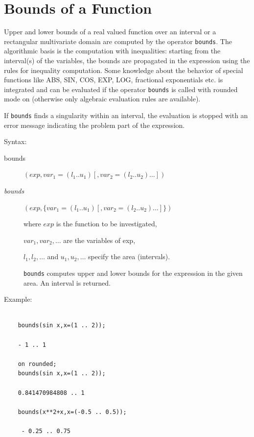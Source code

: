 \section{Bounds of a Function}
\hypertarget{operator:BOUNDS}{}

Upper and lower bounds of a real valued function over an
interval or a rectangular multivariate domain are computed
by the operator \texttt{bounds}. The algorithmic basis is the computation
with inequalities: starting from the interval(s) of the
variables, the bounds are propagated in the expression
using the rules for inequality computation. Some knowledge
about the behavior of special functions like ABS, SIN, COS, EXP, LOG,
fractional exponentials etc. is integrated and can be evaluated
if the operator \texttt{bounds} is called with rounded mode on
(otherwise only algebraic evaluation rules are available).

If \texttt{bounds} finds a singularity within an interval, the evaluation
is stopped with an error message indicating the problem part
of the expression.

Syntax:
\begin{description}
\item[bounds]$(exp,var_1=(l_1 .. u_1) [,var_2=(l_2 .. u_2) \ldots])$

\item[\textit{bounds}]$(exp,\{var_1=(l_1 .. u_1) [,var_2=(l_2 .. u_2)\ldots]\})$

where $exp$ is the function to be investigated,

$var_1, var_2 , \ldots$ are the variables of exp,

$l_1, l_2 , \ldots$  and  $u_1, u_2 , \ldots$ specify the area (intervals).

\texttt{bounds} computes upper and lower bounds for the expression in the
given area. An interval is returned.

\end{description}

Example:

\begin{verbatim}

    bounds(sin x,x=(1 .. 2));

    - 1 .. 1

    on rounded;
    bounds(sin x,x=(1 .. 2));

    0.841470984808 .. 1

    bounds(x**2+x,x=(-0.5 .. 0.5));

     - 0.25 .. 0.75

\end{verbatim}

